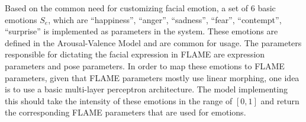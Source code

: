 Based on the common need for customizing facial emotion, a set of 6 basic emotions $S_e$, which are ``happiness'', ``anger'', ``sadness'', ``fear'', ``contempt'', ``surprise'' is implemented as parameters in the system. These emotions are defined in the Arousal-Valence Model and are common for usage. The parameters responsible for dictating the facial expression in FLAME are expression parameters and pose parameters. In order to map these emotions to FLAME parameters, given that FLAME parameters mostly use linear morphing, one idea is to use a basic multi-layer perceptron architecture. The model implementing this should take the intensity of these emotions in the range of $[0,1]$ and return the corresponding FLAME parameters that are used for emotions.